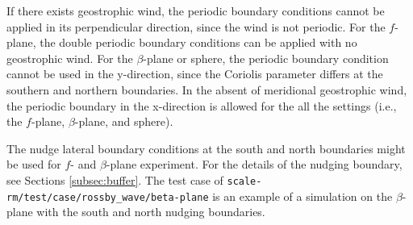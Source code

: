 If there exists geostrophic wind, the periodic boundary conditions cannot be applied in its perpendicular direction, since the wind is not periodic.
For the $f$-plane, the double periodic boundary conditions can be applied with no geostrophic wind.
For the $\beta$-plane or sphere, the periodic boundary condition cannot be used in the y-direction, since the Coriolis parameter differs at the southern and northern boundaries.
In the absent of meridional geostrophic wind, the periodic boundary in the x-direction is allowed for the all the settings (i.e., the $f$-plane, $\beta$-plane, and sphere).


The nudge lateral boundary conditions at the south and north boundaries might be used for $f$- and $\beta$-plane experiment.
For the details of the nudging boundary, see Sections \ref{subsec:buffer}.
The test case of \verb|scale-rm/test/case/rossby_wave/beta-plane| is an example of a simulation on the $\beta$-plane with the south and north nudging boundaries.

